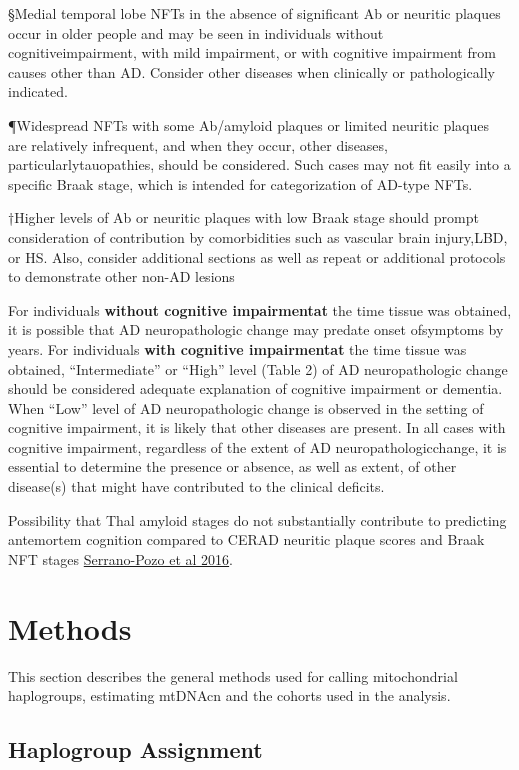 \documentclass[]{book}
\begin{document}
§Medial temporal lobe NFTs in the absence of significant Ab or neuritic plaques occur in older people and may be seen in individuals without cognitiveimpairment, with mild impairment, or with cognitive impairment from causes other than AD. Consider other diseases when clinically or pathologically indicated.

¶Widespread NFTs with some Ab/amyloid plaques or limited neuritic plaques are relatively infrequent, and when they occur, other diseases, particularlytauopathies, should be considered. Such cases may not fit easily into a specific Braak stage, which is intended for categorization of AD-type NFTs.

†Higher levels of Ab or neuritic plaques with low Braak stage should prompt consideration of contribution by comorbidities such as vascular brain injury,LBD, or HS. Also, consider additional sections as well as repeat or additional protocols to demonstrate other non-AD lesions

For individuals \textbf{without cognitive impairmentat} the time tissue was obtained, it is possible that AD neuropathologic change may predate onset ofsymptoms by years. For individuals \textbf{with cognitive impairmentat} the time tissue was obtained, ``Intermediate'' or ``High'' level (Table 2) of AD neuropathologic change should be considered adequate explanation of cognitive impairment or dementia. When ``Low'' level of AD neuropathologic change is observed in the setting of cognitive impairment, it is likely that other diseases are present. In all cases with cognitive impairment, regardless of the extent of AD neuropathologicchange, it is essential to determine the presence or absence, as well as extent, of other disease(s) that might have contributed to the clinical deficits.

Possibility that Thal amyloid stages do not substantially contribute to predicting antemortem cognition compared to CERAD neuritic plaque scores and Braak NFT stages \href{https://doi.org/10.1093/jnen/nlw026}{Serrano-Pozo et al 2016}.

\hypertarget{methods}{%
\chapter{Methods}\label{methods}}

This section describes the general methods used for calling mitochondrial haplogroups, estimating mtDNAcn and the cohorts used in the analysis.

\hypertarget{haplogroup-assignment}{%
\section{Haplogroup Assignment}\label{haplogroup-assignment}}
\end{document}
